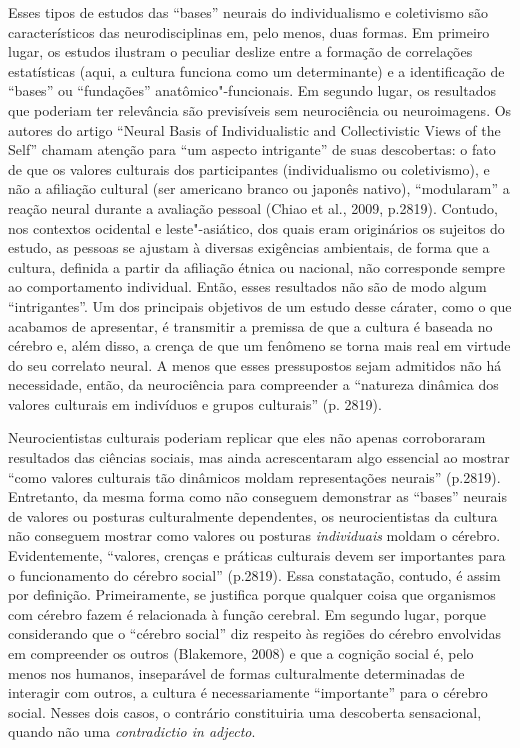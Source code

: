 Esses tipos de estudos das ``bases'' neurais do individualismo e
coletivismo são característicos das neurodisciplinas em, pelo menos,
duas formas. Em primeiro lugar, os estudos ilustram o peculiar deslize
entre a formação de correlações estatísticas (aqui, a cultura funciona
como um determinante) e a identificação de ``bases'' ou ``fundações''
anatômico"-funcionais. Em segundo lugar, os resultados que poderiam ter
relevância são previsíveis sem neurociência ou neuroimagens. Os autores
do artigo ``Neural Basis of Individualistic and Collectivistic Views of
the Self'' chamam atenção para ``um aspecto intrigante'' de suas
descobertas: o fato de que os valores culturais dos participantes
(individualismo ou coletivismo), e não a afiliação cultural (ser
americano branco ou japonês nativo), ``modularam'' a reação neural
durante a avaliação pessoal (Chiao et al., 2009, p.2819). Contudo, nos
contextos ocidental e leste"-asiático, dos quais eram originários os
sujeitos do estudo, as pessoas se ajustam à diversas exigências
ambientais, de forma que a cultura, definida a partir da afiliação
étnica ou nacional, não corresponde sempre ao comportamento individual.
Então, esses resultados não são de modo algum ``intrigantes''. Um dos
principais objetivos de um estudo desse cárater, como o que acabamos de
apresentar, é transmitir a premissa de que a cultura é baseada no
cérebro e, além disso, a crença de que um fenômeno se torna mais real em
virtude do seu correlato neural. A menos que esses pressupostos sejam
admitidos não há necessidade, então, da neurociência para compreender a
``natureza dinâmica dos valores culturais em indivíduos e grupos
culturais'' (p. 2819).

Neurocientistas culturais poderiam replicar que eles não apenas
corroboraram resultados das ciências sociais, mas ainda acrescentaram
algo essencial ao mostrar ``como valores culturais tão dinâmicos moldam
representações neurais'' (p.2819). Entretanto, da mesma forma como não
conseguem demonstrar as ``bases'' neurais de valores ou posturas
culturalmente dependentes, os neurocientistas da cultura não conseguem
mostrar como valores ou posturas \emph{individuais} moldam o cérebro.
Evidentemente, ``valores, crenças e práticas culturais devem ser
importantes para o funcionamento do cérebro social'' (p.2819). Essa
constatação, contudo, é assim por definição. Primeiramente, se justifica
porque qualquer coisa que organismos com cérebro fazem é relacionada à
função cerebral. Em segundo lugar, porque considerando que o ``cérebro
social'' diz respeito às regiões do cérebro envolvidas em compreender os
outros (Blakemore, 2008) e que a cognição social é, pelo menos nos
humanos, inseparável de formas culturalmente determinadas de interagir
com outros, a cultura é necessariamente ``importante'' para o cérebro
social. Nesses dois casos, o contrário constituiria uma descoberta
sensacional, quando não uma \emph{contradictio in adjecto}.

